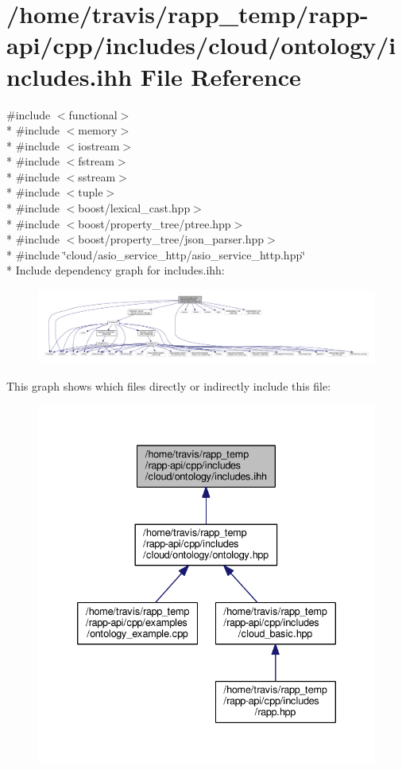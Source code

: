 \hypertarget{cloud_2ontology_2includes_8ihh}{\section{/home/travis/rapp\-\_\-temp/rapp-\/api/cpp/includes/cloud/ontology/includes.ihh File Reference}
\label{cloud_2ontology_2includes_8ihh}
}
{\ttfamily \#include $<$functional$>$}\\*
{\ttfamily \#include $<$memory$>$}\\*
{\ttfamily \#include $<$iostream$>$}\\*
{\ttfamily \#include $<$fstream$>$}\\*
{\ttfamily \#include $<$sstream$>$}\\*
{\ttfamily \#include $<$tuple$>$}\\*
{\ttfamily \#include $<$boost/lexical\-\_\-cast.\-hpp$>$}\\*
{\ttfamily \#include $<$boost/property\-\_\-tree/ptree.\-hpp$>$}\\*
{\ttfamily \#include $<$boost/property\-\_\-tree/json\-\_\-parser.\-hpp$>$}\\*
{\ttfamily \#include \char`\"{}cloud/asio\-\_\-service\-\_\-http/asio\-\_\-service\-\_\-http.\-hpp\char`\"{}}\\*
Include dependency graph for includes.\-ihh\-:
\nopagebreak
\begin{figure}[H]
\begin{center}
\leavevmode
\includegraphics[width=350pt]{cloud_2ontology_2includes_8ihh__incl}
\end{center}
\end{figure}
This graph shows which files directly or indirectly include this file\-:
\nopagebreak
\begin{figure}[H]
\begin{center}
\leavevmode
\includegraphics[width=335pt]{cloud_2ontology_2includes_8ihh__dep__incl}
\end{center}
\end{figure}
